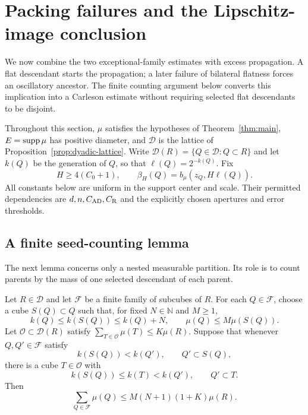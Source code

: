 \section[Packing failures and Lipschitz images]{Packing failures and the Lipschitz-image conclusion}
\label{sec:packing-endpoint}

We now combine the two exceptional-family estimates with excess
propagation.  A flat descendant starts the propagation; a later failure
of bilateral flatness forces an oscillatory ancestor.  The finite counting
argument below converts this implication into a Carleson estimate without
requiring selected flat descendants to be disjoint.

Throughout this section, $\mu$ satisfies the hypotheses of
Theorem~\ref{thm:main}, $E=\operatorname{supp}\mu$ has positive diameter, and
$\mathcal D$ is the lattice of Proposition~\ref{prop:dyadic-lattice}.
Write $\mathcal D(R)=\{Q\in\mathcal D:Q\subset R\}$ and let $k(Q)$
be the generation of $Q$, so that $\ell(Q)=2^{-k(Q)}$.  Fix
\[
 H\geq 4(C_0+1),\qquad
 \beta_H(Q)=b_\mu(z_Q,H\ell(Q)).
\]
All constants below are uniform in the support center and scale.  Their
permitted dependencies are $d,n,C_{\rm AD},C_{\rm R}$ and the explicitly
chosen apertures and error thresholds.

\subsection{A finite seed-counting lemma}

The next lemma concerns only a nested measurable partition.  Its role is
to count parents by the mass of one selected descendant of each parent.

\begin{lemma}\label{lem:seed-charging}
Let $R\in\mathcal D$ and let $\mathcal F$ be a finite family of
subcubes of $R$.  For each $Q\in\mathcal F$, choose a cube $S(Q)\subset Q$
such that, for fixed $N\in\mathbb N$ and $M\geq1$,
\[
 k(Q)\leq k(S(Q))\leq k(Q)+N,
 \qquad \mu(Q)\leq M\mu(S(Q)).
\]
Let $\mathcal O\subset\mathcal D(R)$ satisfy
$\sum_{T\in\mathcal O}\mu(T)\leq K\mu(R)$.
Suppose that whenever $Q,Q'\in\mathcal F$ satisfy
\[
 k(S(Q))<k(Q'),\qquad Q'\subset S(Q),
\]
there is a cube $T\in\mathcal O$ with
\[
 k(S(Q))\leq k(T)<k(Q'),\qquad Q'\subset T.
\]
Then
\[
 \sum_{Q\in\mathcal F}\mu(Q)
 \leq M(N+1)(1+K)\mu(R).
\]
\end{lemma}

